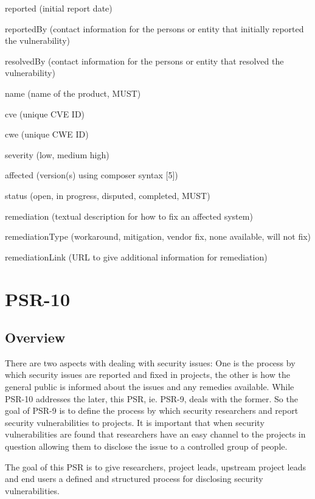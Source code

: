 \begin{compactitem}
\item reported (initial report date)
\item reportedBy (contact information for the persons or entity that initially reported the vulnerability)
\item resolvedBy (contact information for the persons or entity that resolved the vulnerability)
\item name (name of the product, MUST)
\item cve (unique CVE ID)
\item cwe (unique CWE ID)
\item severity (low, medium high)
\item affected (version(s) using composer syntax [5])
\item status (open, in progress, disputed, completed, MUST)
\item remediation (textual description for how to fix an affected system)
\item remediationType (workaround, mitigation, vendor fix, none available, will not fix)
\item remediationLink (URL to give additional information for remediation)
\end{compactitem}


\chapter{PSR-10}

\section{Overview}

There are two aspects with dealing with security issues: One is the process by which security issues are reported and fixed in projects, the other is how the general public is informed about the issues and any remedies available. While PSR-10 addresses the later, this PSR, ie. PSR-9, deals with the former. So the goal of PSR-9 is to define the process by which security researchers and report security vulnerabilities to projects. It is important that when security vulnerabilities are found that researchers have an easy channel to the projects in question allowing them to disclose the issue to a controlled group of people.

The goal of this PSR is to give researchers, project leads, upstream project leads and end users a defined and structured process for disclosing security vulnerabilities.



